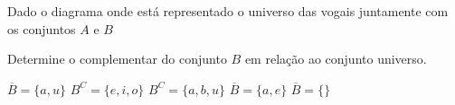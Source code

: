 Dado o diagrama onde está representado o universo das vogais juntamente com os conjuntos $A$ e $B$


\begin{center}
\end{center}
\vspace{-5mm}

Determine o complementar do conjunto $B$ em relação ao conjunto universo.

\noindent\parbox{\linewidth}{

$\overline{B}=\{a,u\}$
$B^C=\{e,i,o\}$
$B^C=\{a,b,u\}$
$\overline{B}=\{a,e\}$
$\overline{B}=\{\}$



}




